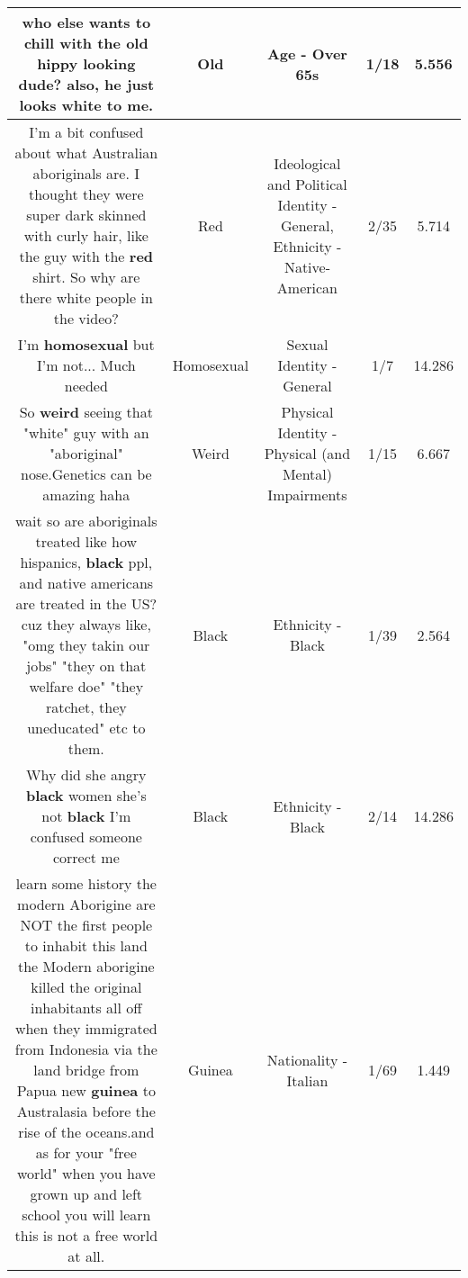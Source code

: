 \documentclass[11pt]{article}
\newlength\mylength
\begin{document}
\begin{center}
\begin{longtable}{|C{.65\mylength}|C{.30\mylength}|C{.12\mylength}|C{.12\mylength}|C{.12\mylength}|}
  \small who else wants to chill with the \textbf{old} hippy looking dude? also, he just looks white to me.\normalsize   & Old & Age - Over 65s & 1/18 & 5.556 \\  \hline
  \small I'm a bit confused about what Australian aboriginals are. I thought they were super dark skinned with curly hair, like the guy with the \textbf{r\textbf{ed}} shirt. So why are there white people in the video?\normalsize   & Red &  Ideological and Political Identity - General, Ethnicity - Native-American & 2/35 & 5.714 \\  \hline
  \small I'm \textbf{homosexual} but I'm not... Much needed\normalsize   & Homosexual & Sexual Identity - General & 1/7 & 14.286 \\  \hline
  \small So \textbf{weird} seeing that "white" guy with an "aboriginal" nose.Genetics can be amazing haha\normalsize   & Weird & Physical Identity - Physical (and Mental) Impairments & 1/15 & 6.667 \\  \hline
  \small wait so are aboriginals treated like how hispanics, \textbf{black} ppl, and native americans are treated in the US? cuz they always like, "omg they takin our jobs" "they on that welfare doe" "they ratchet, they uneducated" etc to them.\normalsize   & Black & Ethnicity - Black & 1/39 & 2.564 \\  \hline
  \small Why did she angry \textbf{black} women she's not \textbf{black} I'm confused someone correct me\normalsize   & Black & Ethnicity - Black & 2/14 & 14.286 \\  \hline
  \small learn some history the modern Aborigine are NOT the first people to inhabit this land the Modern aborigine killed the original inhabitants all off when they immigrated from Indonesia via the land bridge from Papua new \textbf{guinea} to Australasia before the rise of the oceans.and as for your "free world" when you have grown up and left school you will learn this is not a free world at all.\normalsize   & Guinea & Nationality - Italian & 1/69 & 1.449 \\  \hline

\end{longtable}
\end{center}
\end{document}
